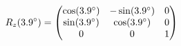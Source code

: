 \documentclass[preview]{standalone}
\begin{document}
\begin{align*}
\special{dvisvgm:raw <g id='unique000'>}R_z(3.9^\circ) = \begin{pmatrix} \cos(3.9^\circ) & -\sin(3.9^\circ) & 0 \\ \sin(3.9^\circ) & \cos(3.9^\circ) & 0 \\ 0 & 0 & 1 \end{pmatrix}\special{dvisvgm:raw </g>}
\end{align*}
\end{document}
